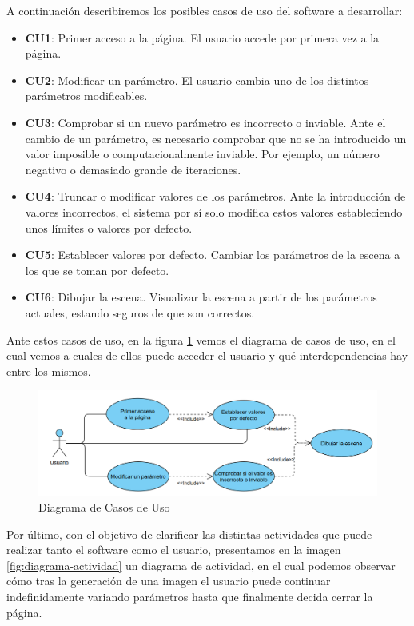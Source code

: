 A continuación describiremos los posibles casos de uso del software a desarrollar:
\begin{itemize}
    \item \textbf{CU1}: Primer acceso a la página. El usuario accede por primera vez a la página.
    \item \textbf{CU2}: Modificar un parámetro. El usuario cambia uno de los distintos parámetros modificables.
    \item \textbf{CU3}: Comprobar si un nuevo parámetro es incorrecto o inviable. Ante el cambio de un parámetro, es necesario comprobar que no se ha introducido un valor imposible o computacionalmente inviable. Por ejemplo, un número negativo o demasiado grande de iteraciones.
    \item \textbf{CU4}: Truncar o modificar valores de los parámetros. Ante la introducción de valores incorrectos, el sistema por sí solo modifica estos valores estableciendo unos límites o valores por defecto.
    \item \textbf{CU5}: Establecer valores por defecto. Cambiar los parámetros de la escena a los que se toman por defecto.
    \item \textbf{CU6}: Dibujar la escena. Visualizar la escena a partir de los parámetros actuales, estando seguros de que son correctos.
\end{itemize}

Ante estos casos de uso, en la figura \ref{fig:casos-uso} vemos el diagrama de casos de uso, en el cual vemos a cuales de ellos puede acceder el usuario y qué interdependencias hay entre los mismos.

\begin{figure} [ht]
\centering
\includegraphics[width=15cm]{img/diagrama-CU.png}
\caption{Diagrama de Casos de Uso}
    \label{fig:casos-uso}
\end{figure}

Por último, con el objetivo de clarificar las distintas actividades que puede realizar tanto el software como el usuario, presentamos en la imagen \ref{fig:diagrama-actividad} un diagrama de actividad, en el cual podemos observar cómo tras la generación de una imagen el usuario puede continuar indefinidamente variando parámetros hasta que finalmente decida cerrar la página.

